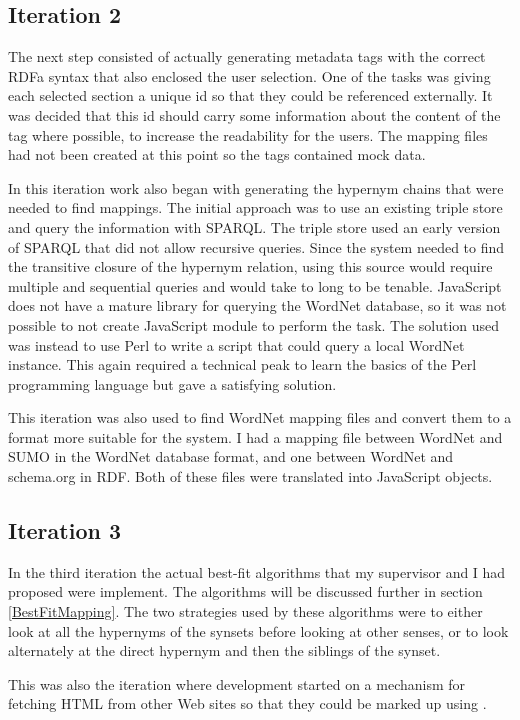 \subsection{Iteration 2}
The next step consisted of actually generating metadata tags with the correct RDFa syntax that also enclosed the user selection.
One of the tasks was giving each selected section a unique id so that they could be referenced externally.
It was decided that this id should carry some information about the content of the tag where possible,
to increase the readability for the users.
The mapping files had not been created at this point so the tags contained mock data.

In this iteration work also began with generating the hypernym chains that were needed to find mappings.
The initial approach was to use an existing triple store and query the information with SPARQL.
The triple store used an early version of SPARQL that did not allow recursive queries.
Since the system needed to find the transitive closure of the hypernym relation,
using this source would require multiple and sequential queries and would take to long to be tenable.
JavaScript does not have a mature library for querying the WordNet database,
so it was not possible to not create JavaScript module to perform the task.
The solution used was instead to use Perl to write a script that could query a local WordNet instance.
This again required a technical peak to learn the basics of the Perl programming language but gave a satisfying solution.

This iteration was also used to find WordNet mapping files and convert them to a format more suitable for the system.
I had a mapping file between WordNet and SUMO in the WordNet database format,
and one between WordNet and schema.org in RDF.
Both of these files were translated into JavaScript objects.

\subsection{Iteration 3}
In the third iteration the actual best-fit algorithms that my supervisor and I had proposed were implement.
The algorithms will be discussed further in section \ref{BestFitMapping}.
The two strategies used by these algorithms were to either look at all the hypernyms of the synsets before looking at other senses,
or to look alternately at the direct hypernym and then the siblings of the synset.

This was also the iteration where development started on  a mechanism for fetching HTML from other Web sites so that they could be
marked up using \theartefact.

